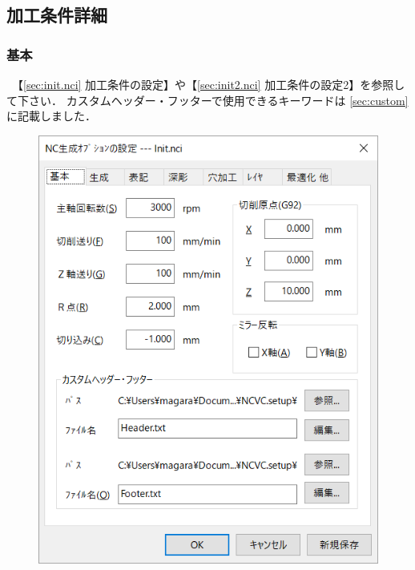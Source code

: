 
\subsection{加工条件詳細}
\label{sec:make}

\subsubsection{基本}
\begin{minipage}[t]{0.5\textwidth}
　【\ref{sec:init.nci} 加工条件の設定】や【\ref{sec:init2.nci} 加工条件の設定2】を参照して下さい．
カスタムヘッダー・フッターで使用できるキーワードは \ref{sec:custom} に記載しました．
\end{minipage}
\begin{minipage}[t]{0.5\textwidth}
\vspace*{-2zh}
\begin{figure}[H]
\centering
\includegraphics[scale=0.7]{No6/fig/init1.png}
\label{fig:init1.png}
\end{figure}
\end{minipage}

